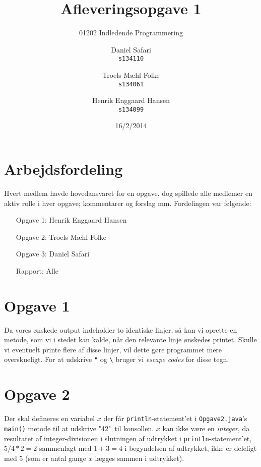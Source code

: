 \documentclass{scrartcl}
\newcommand\code[1]{\texttt{#1}}
\begin{document}

\title{Afleveringsopgave 1}
\subtitle{01202 Indledende Programmering}
\author{
  Daniel Safari\\
  \texttt{s134110}
  \and
  Troels Mæhl Folke\\
  \texttt{s134061}
   \and
  Henrik Enggaard Hansen\\
  \texttt{s134099}
}
\date{16/2/2014}
\maketitle
\thispagestyle{empty}
\setcounter{page}{0}
\null
\vfill
\section*{Arbejdsfordeling}
Hvert medlem havde hovedansvaret for en opgave, dog spillede alle medlemer en aktiv rolle i hver opgave; kommentarer og forslag mm. Fordelingen var følgende:
\begin{itemize}
\setlength{\itemindent}{3em}
\item[Opgave 1:] Henrik Enggaard Hansen
\item[Opgave 2:] Troels Mæhl Folke
\item[Opgave 3:] Daniel Safari
\item[Rapport:]  Alle
\end{itemize}
\newpage
\section*{Opgave 1}
Da vores ønskede output indeholder to identiske linjer, så kan vi oprette en metode, som vi i stedet kan kalde, når den relevante linje ønskedes printet. Skulle vi eventuelt printe flere af disse linjer, vil dette gøre programmet mere overskueligt. For at udskrive \code{"} og \code{\textbackslash} bruger vi \emph{escape codes} for disse tegn.

\section*{Opgave 2}
Der skal defineres en variabel $x$ der får \code{println}-statement'et i \code{Opgave2.java}'s
\code{main()} metode til at udskrive "42"\ til konsollen.
$x$ kan ikke være en \emph{integer}, da resultatet af integer-divisionen i slutningen af
udtrykket i \code{println}-statement'et, $5/4*2=2$ sammenlagt med $1+3=4$ i
begyndelsen af udtrykket, ikke er
deleligt med 5 (som er antal gange $x$ lægges sammen i udtrykket).
\end{document}
